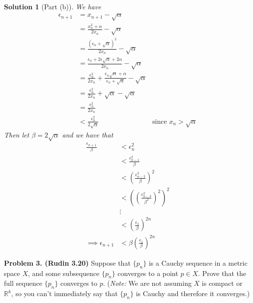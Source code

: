 \documentclass[leqno]{article}
\theoremstyle{nonumberplain}
\newtheorem{solution}{Solution}
\begin{document}
\begin{solution}[Part (b)]
We have
\begin{align*}
\epsilon_{n+1}&=x_{n+1}-\sqrt{\alpha}\\
&=\frac{x_n^2+\alpha}{2x_n}-\sqrt{\alpha}\\
&=\frac{(\epsilon_n+\sqrt{\alpha})^2}{2x_n}-\sqrt{\alpha}\\
&=\frac{\epsilon_n+2\epsilon\sqrt{\alpha}+2\alpha}{2x_n}-\sqrt{\alpha}\\
&=\frac{\epsilon_n^2}{2x_n}+\frac{\epsilon_n\sqrt{\alpha}+\alpha}{\epsilon_n+\sqrt{\alpha}}-\sqrt{\alpha}\\
&=\frac{\epsilon_n^2}{2x_n}+\sqrt{\alpha}-\sqrt{\alpha}\\
&=\frac{\epsilon_n^2}{2x_n}\\
&<\frac{\epsilon_n^2}{2\sqrt{\alpha}} &\textrm{since $x_n>\sqrt{\alpha}$}
\end{align*}
Then let $\beta=2\sqrt{\alpha}$ and we have that 
\begin{align*}
\frac{\epsilon_{n+1}}{\beta}&<\epsilon_n^2\\
&<\frac{\epsilon_{n-1}^2}{\beta}\\
&<\left(\frac{\epsilon_{n-2}^2}{\beta}\right)^2\\
&<\left(\left(\frac{\epsilon_{n-3}^2}{\beta^2}\right)^2\right)^2\\
&\vdots\\
&<\left(\frac{\epsilon_1}{\beta}\right)^{2n}\\
\implies \epsilon_{n+1}&<\beta\left(\frac{\epsilon_1}{\beta}\right)^{2n}
\end{align*}
\end{solution}

\pagebreak




\noindent\textbf{Problem 3. (Rudin 3.20)} Suppose that $\{p_n\}$ is a Cauchy sequence in a metric space $X$, and some subsequence $\{p_n\}$ converges to a point $p\in X$. Prove that the full sequence $\{p_n\}$ converges to $p$. (\emph{Note:} We are not assuming $X$ is compact or $\mathbb{R}^k$, so you can't immediately say that $\{p_n\}$ is Cauchy and therefore it converges.) 
\end{document}
